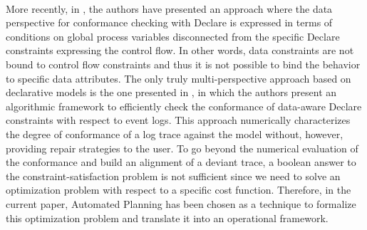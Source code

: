 \\
\indent
{More recently, in \cite{Borrego014}, the authors have presented an approach where the data perspective for conformance checking with Declare is expressed in terms of conditions on global process variables disconnected from the specific Declare constraints expressing the control flow. In other words, data constraints are not bound to control flow constraints and thus it is not possible to bind the behavior to specific data attributes. The only truly multi-perspective approach based on declarative models is the one presented in \cite{BurattinMS16}, in which the authors present an algorithmic framework to efficiently check the conformance of data-aware Declare constraints with respect to event logs. This approach numerically characterizes the degree of conformance of a log trace against the model without, however, providing repair strategies to the user. To go beyond the numerical evaluation of the conformance and build an alignment of a deviant trace, a boolean answer to the constraint-satisfaction problem is not sufficient since we need to solve an optimization problem with respect to a specific cost function. Therefore, in the current paper, Automated Planning has been chosen as a technique to formalize this optimization problem and translate it into an operational framework.}

